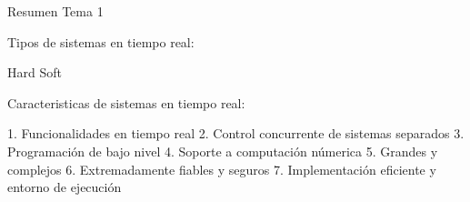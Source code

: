 Resumen Tema 1

Tipos de sistemas en tiempo real:

	Hard
	Soft

Caracteristicas de sistemas en tiempo real:

	1. Funcionalidades en tiempo real
	2. Control concurrente de sistemas separados
	3. Programación de bajo nivel
	4. Soporte a computación númerica
	5. Grandes y complejos
	6. Extremadamente fiables y seguros
	7. Implementación eficiente y entorno de ejecución
